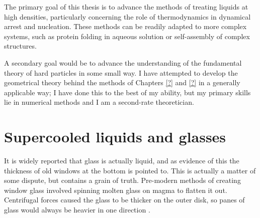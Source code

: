 \documentclass[11pt,twoside]{report}
\begin{document}
The primary goal of this thesis is to advance the methods of treating liquids at high densities, particularly concerning the role of thermodynamics in dynamical arrest and nucleation.
These methods can be readily adapted to more complex systems, such as protein folding in aqueous solution or self-assembly of complex structures.

A secondary goal would be to advance the understanding of the fundamental theory of hard particles in some small way.
I have attempted to develop the geometrical theory behind the methods of Chapters \ref{?} and \ref{?} in a generally applicable way;
I have done this to the best of my ability, but my primary skills lie in numerical methods and I am a second-rate theoretician.

\section{Supercooled liquids and glasses}

It is widely reported that glass is actually liquid, and as evidence of this the thickness of old windows at the bottom is pointed to.
This is actually a matter of some dispute, but contains a grain of truth.
Pre-modern methods of creating window glass involved spinning molten glass on magma to flatten it out.
Centrifugal forces caused the glass to be thicker on the outer disk, so panes of glass would always be heavier in one direction%
.
\end{document}
